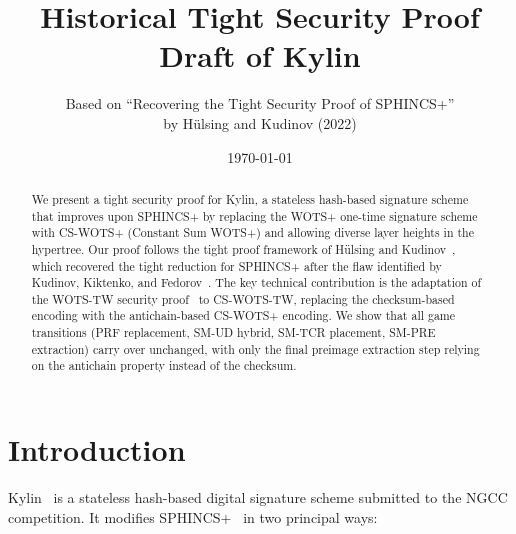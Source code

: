 \documentclass[11pt,a4paper]{article}
\title{Historical Tight Security Proof Draft of Kylin}
\author{Based on ``Recovering the Tight Security Proof of SPHINCS+''\\ by H\"ulsing and Kudinov (2022)}
\date{\today}
\begin{document}
\maketitle

\begin{center}
\end{center}

\begin{abstract}
We present a tight security proof for Kylin, a stateless hash-based signature scheme that improves upon SPHINCS+ by replacing the WOTS+ one-time signature scheme with CS-WOTS+ (Constant Sum WOTS+) and allowing diverse layer heights in the hypertree. Our proof follows the tight proof framework of H\"ulsing and Kudinov~\cite{HK22}, which recovered the tight reduction for SPHINCS+ after the flaw identified by Kudinov, Kiktenko, and Fedorov~\cite{KKF20}. The key technical contribution is the adaptation of the WOTS-TW security proof~\cite[Theorem~1]{HK22} to CS-WOTS-TW, replacing the checksum-based encoding with the antichain-based CS-WOTS+ encoding. We show that all game transitions (PRF replacement, SM-UD hybrid, SM-TCR placement, SM-PRE extraction) carry over unchanged, with only the final preimage extraction step relying on the antichain property instead of the checksum.
\end{abstract}

\tableofcontents

\section{Introduction}

Kylin~\cite{kylin} is a stateless hash-based digital signature scheme submitted to the NGCC competition. It modifies SPHINCS+~\cite{BHK+19} in two principal ways:
\end{document}
